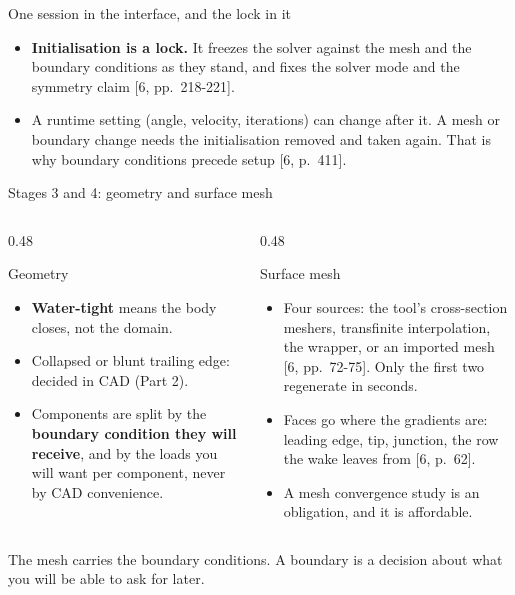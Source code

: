 \begin{frame}{One session in the interface, and the lock in it}
\begin{itemize}\small
  \item \textbf{Initialisation is a lock.} It freezes the solver against the
        mesh and the boundary conditions as they stand, and fixes the solver
        mode and the symmetry claim [6, pp.~218-221].
  \item A runtime setting (angle, velocity, iterations) can change after it.
        A mesh or boundary change needs the initialisation removed and taken
        again. That is why boundary conditions precede setup [6, p.~411].
\end{itemize}
\end{frame}

\begin{frame}{Stages 3 and 4: geometry and surface mesh}
\begin{columns}[T]
\begin{column}{0.48\textwidth}
\begin{block}{Geometry}
\begin{itemize}\small
  \item \textbf{Water-tight} means the body closes, not the domain.
  \item Collapsed or blunt trailing edge: decided in CAD (Part 2).
  \item Components are split by the \textbf{boundary condition they will
        receive}, and by the loads you will want per component, never by CAD
        convenience.
\end{itemize}
\end{block}
\end{column}
\begin{column}{0.48\textwidth}
\begin{block}{Surface mesh}
\begin{itemize}\small
  \item Four sources: the tool's cross-section meshers, transfinite
        interpolation, the wrapper, or an imported mesh [6, pp.~72-75].
        Only the first two regenerate in seconds.
  \item Faces go where the gradients are: leading edge, tip, junction, the
        row the wake leaves from [6, p.~62].
  \item A mesh convergence study is an obligation, and it is affordable.
\end{itemize}
\end{block}
\end{column}
\end{columns}
\begin{takeaway}The mesh carries the boundary conditions. A boundary is a
decision about what you will be able to ask for later.\end{takeaway}
\end{frame}

